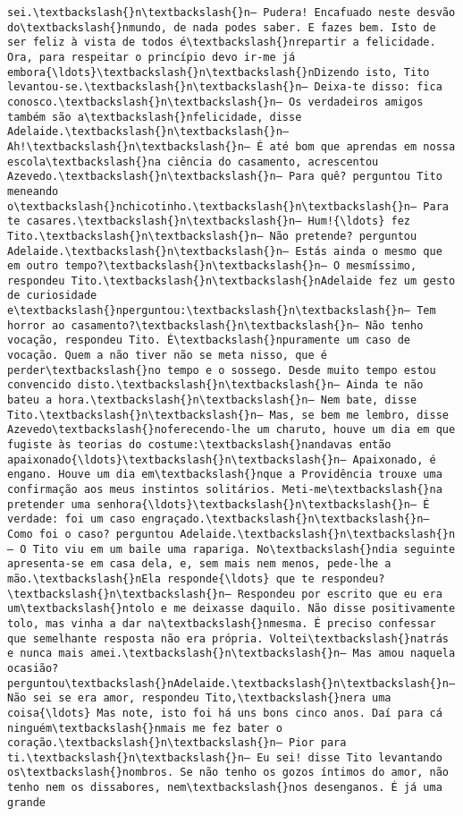 \documentclass[11pt]{article}
\begin{document}
\begin{Verbatim}[commandchars=\\\{\}]
sei.\textbackslash{}n\textbackslash{}n— Pudera! Encafuado neste desvão do\textbackslash{}nmundo, de nada podes saber. E fazes bem. Isto de ser feliz à vista de todos é\textbackslash{}nrepartir a felicidade. Ora, para respeitar o princípio devo ir-me já embora{\ldots}\textbackslash{}n\textbackslash{}nDizendo isto, Tito levantou-se.\textbackslash{}n\textbackslash{}n— Deixa-te disso: fica conosco.\textbackslash{}n\textbackslash{}n— Os verdadeiros amigos também são a\textbackslash{}nfelicidade, disse Adelaide.\textbackslash{}n\textbackslash{}n— Ah!\textbackslash{}n\textbackslash{}n— É até bom que aprendas em nossa escola\textbackslash{}na ciência do casamento, acrescentou Azevedo.\textbackslash{}n\textbackslash{}n— Para quê? perguntou Tito meneando o\textbackslash{}nchicotinho.\textbackslash{}n\textbackslash{}n— Para te casares.\textbackslash{}n\textbackslash{}n— Hum!{\ldots} fez Tito.\textbackslash{}n\textbackslash{}n— Não pretende? perguntou Adelaide.\textbackslash{}n\textbackslash{}n— Estás ainda o mesmo que em outro tempo?\textbackslash{}n\textbackslash{}n— O mesmíssimo, respondeu Tito.\textbackslash{}n\textbackslash{}nAdelaide fez um gesto de curiosidade e\textbackslash{}nperguntou:\textbackslash{}n\textbackslash{}n— Tem horror ao casamento?\textbackslash{}n\textbackslash{}n— Não tenho vocação, respondeu Tito. É\textbackslash{}npuramente um caso de vocação. Quem a não tiver não se meta nisso, que é perder\textbackslash{}no tempo e o sossego. Desde muito tempo estou convencido disto.\textbackslash{}n\textbackslash{}n— Ainda te não bateu a hora.\textbackslash{}n\textbackslash{}n— Nem bate, disse Tito.\textbackslash{}n\textbackslash{}n— Mas, se bem me lembro, disse Azevedo\textbackslash{}noferecendo-lhe um charuto, houve um dia em que fugiste às teorias do costume:\textbackslash{}nandavas então apaixonado{\ldots}\textbackslash{}n\textbackslash{}n— Apaixonado, é engano. Houve um dia em\textbackslash{}nque a Providência trouxe uma confirmação aos meus instintos solitários. Meti-me\textbackslash{}na pretender uma senhora{\ldots}\textbackslash{}n\textbackslash{}n— É verdade: foi um caso engraçado.\textbackslash{}n\textbackslash{}n— Como foi o caso? perguntou Adelaide.\textbackslash{}n\textbackslash{}n— O Tito viu em um baile uma rapariga. No\textbackslash{}ndia seguinte apresenta-se em casa dela, e, sem mais nem menos, pede-lhe a mão.\textbackslash{}nEla responde{\ldots} que te respondeu?\textbackslash{}n\textbackslash{}n— Respondeu por escrito que eu era um\textbackslash{}ntolo e me deixasse daquilo. Não disse positivamente tolo, mas vinha a dar na\textbackslash{}nmesma. É preciso confessar que semelhante resposta não era própria. Voltei\textbackslash{}natrás e nunca mais amei.\textbackslash{}n\textbackslash{}n— Mas amou naquela ocasião? perguntou\textbackslash{}nAdelaide.\textbackslash{}n\textbackslash{}n— Não sei se era amor, respondeu Tito,\textbackslash{}nera uma coisa{\ldots} Mas note, isto foi há uns bons cinco anos. Daí para cá ninguém\textbackslash{}nmais me fez bater o coração.\textbackslash{}n\textbackslash{}n— Pior para ti.\textbackslash{}n\textbackslash{}n— Eu sei! disse Tito levantando os\textbackslash{}nombros. Se não tenho os gozos íntimos do amor, não tenho nem os dissabores, nem\textbackslash{}nos desenganos. É já uma grande 
\end{Verbatim}
\end{document}
